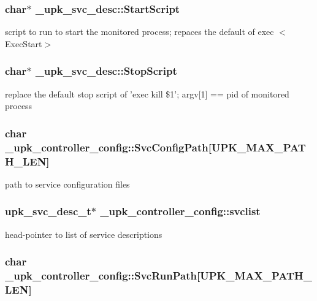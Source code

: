 \subsubsection{\setlength{\rightskip}{0pt plus 5cm}char$\ast$ \bf{\_\-upk\_\-svc\_\-desc::Start\-Script}\hspace{0.3cm}{\tt  [inherited]}}\label{group__config__impl_g1dcab37c6c89587c91fd7b3d87e0f3c4}


script to run to start the monitored process; repaces the default of exec $<$Exec\-Start$>$ 
\subsubsection{\setlength{\rightskip}{0pt plus 5cm}char$\ast$ \bf{\_\-upk\_\-svc\_\-desc::Stop\-Script}\hspace{0.3cm}{\tt  [inherited]}}\label{group__config__impl_ge3b51c15e5de4234289443dd3de00398}


replace the default stop script of 'exec kill \$1'; argv[1] == pid of monitored process 
\subsubsection{\setlength{\rightskip}{0pt plus 5cm}char \bf{\_\-upk\_\-controller\_\-config::Svc\-Config\-Path}[UPK\_\-MAX\_\-PATH\_\-LEN]\hspace{0.3cm}{\tt  [inherited]}}\label{group__config__impl_g286418d5e7c00cedaa1ec701fd0c40ff}


path to service configuration files 
\subsubsection{\setlength{\rightskip}{0pt plus 5cm}\bf{upk\_\-svc\_\-desc\_\-t}$\ast$ \bf{\_\-upk\_\-controller\_\-config::svclist}\hspace{0.3cm}{\tt  [inherited]}}\label{group__config__impl_g9199da20ade1ea1e50ff15dc40c6a658}


head-pointer to list of service descriptions 
\subsubsection{\setlength{\rightskip}{0pt plus 5cm}char \bf{\_\-upk\_\-controller\_\-config::Svc\-Run\-Path}[UPK\_\-MAX\_\-PATH\_\-LEN]\hspace{0.3cm}{\tt  [inherited]}}\label{group__config__impl_gc543ab5795684739283f1aa2600f97db}



